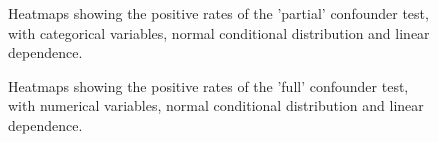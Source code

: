 \begin{figure}[H]
  \centering
  \caption{Heatmaps showing the positive rates of the 'partial' confounder test, with categorical variables, normal conditional distribution and linear dependence.}
  \label{fig:sim-bbb-lin-partial}
\end{figure}

\begin{figure}[H]
  \centering
  \caption{Heatmaps showing the positive rates of the 'full' confounder test, with numerical variables, normal conditional distribution and linear dependence.}
  \label{fig:sim-ccc-lin-full}
\end{figure}

